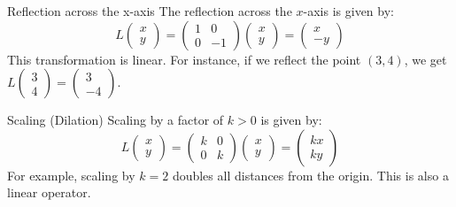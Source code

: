 \documentclass[12pt,a4paper]{article}
\begin{document}
	\begin{example}{Reflection across the x-axis}
		The reflection across the $x$-axis is given by:
		\[
		L\begin{pmatrix} x \\ y \end{pmatrix} = \begin{pmatrix} 1 & 0 \\ 0 & -1 \end{pmatrix} \begin{pmatrix} x \\ y \end{pmatrix} = \begin{pmatrix} x \\ -y \end{pmatrix}
		\]
		This transformation is linear. For instance, if we reflect the point $(3, 4)$, we get $L\begin{pmatrix} 3 \\ 4 \end{pmatrix} = \begin{pmatrix} 3 \\ -4 \end{pmatrix}$.
	\end{example}
	
	\begin{example}{Scaling (Dilation)}
		Scaling by a factor of $k > 0$ is given by:
		\[
		L\begin{pmatrix} x \\ y \end{pmatrix} = \begin{pmatrix} k & 0 \\ 0 & k \end{pmatrix} \begin{pmatrix} x \\ y \end{pmatrix} = \begin{pmatrix} kx \\ ky \end{pmatrix}
		\]
		For example, scaling by $k = 2$ doubles all distances from the origin. This is also a linear operator.
	\end{example}
	
\end{document}
